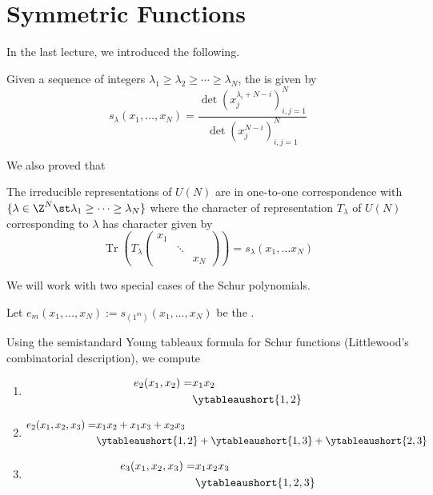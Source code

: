 \documentclass[11pt,leqno,oneside]{amsart}
\numberwithin{thm}{section}
\newcommand{\trace}{\operatorname{Tr}}
\begin{document}
\section{Symmetric Functions}
In the last lecture, we introduced the following.
\begin{defn}
  Given a sequence of integers \(\lambda_1 \geq \lambda_2 \geq \cdots
  \geq \lambda_N\), the  is given by \[
    s_\lambda(x_1, \ldots, x_N) =
    \frac{\det(x_j^{\lambda_i+N-i})_{i,j=1}^N}{\det(x_j^{N-i})_{i,j=1}^N}
  \]
\end{defn}
We also proved that
\begin{thm}
  The irreducible representations of \(U(N)\) are in one-to-one
  correspondence with \(\{\lambda \in \Z^N \st \lambda_1 \geq \cdots
  \geq \lambda_N\}\) where the character of representation
  \(T_\lambda\) of 
  \(U(N)\) corresponding to \(\lambda\) has character given by
  \[
    \trace\left( T_\lambda\left(
      \begin{array}{ccc}
        x_1&&\\
           &\ddots&\\
           &&x_N
      \end{array}
    \right) \right) = s_\lambda(x_1, \ldots x_N)
  \]
\end{thm}
We will work with two special cases of the Schur polynomials.
\begin{defn}
  Let \(e_m(x_1, \ldots, x_N) := s_{(1^m)}(x_1, \ldots, x_N)\) be the
  . 
\end{defn}
\begin{example}
  Using the semistandard Young tableaux formula for Schur functions
  (Littlewood's combinatorial description), we compute
  \begin{enumerate}
  \item
    \begin{align*}
      e_2(x_1,x_2) =
      & x_1 x_2\\
      & \ytableaushort{1,2}
    \end{align*}
  \item
    \begin{align*}
      e_2(x_1,x_2,x_3) =
      & x_1 x_2 + x_1 x_3 + x_2 x_3 \\
      & \ytableaushort{1,2} + \ytableaushort{1,3} + \ytableaushort{2,3}
    \end{align*}
  \item
    \begin{align*}
      e_3(x_1,x_2,x_3) =
      & x_1 x_2 x_3 \\
      & \ytableaushort{1,2,3}
    \end{align*}
  \end{enumerate}
\end{example}
\end{document}
